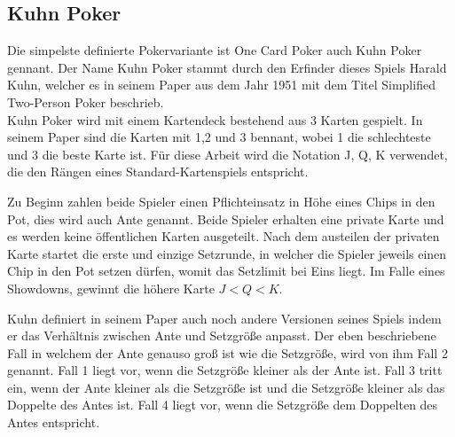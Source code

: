 \subsection{Kuhn Poker}
Die simpelste definierte Pokervariante ist One Card Poker auch Kuhn Poker gennant.
Der Name Kuhn Poker stammt durch den Erfinder dieses Spiels Harald Kuhn, welcher es in seinem Paper aus dem Jahr 1951 mit dem Titel \grqq Simplified Two-Person Poker \glqq beschrieb. \\
Kuhn Poker wird mit einem Kartendeck bestehend aus 3 Karten gespielt.
In seinem Paper sind die Karten mit 1,2 und 3 bennant, wobei 1 die schlechteste und 3 die beste Karte ist.
Für diese Arbeit wird die Notation J, Q, K verwendet, die den Rängen eines Standard-Kartenspiels entspricht.

Zu Beginn zahlen beide Spieler einen Pflichteinsatz in Höhe eines Chips in den Pot, dies wird auch Ante genannt. 
Beide Spieler erhalten eine private Karte und es werden keine öffentlichen Karten ausgeteilt.
Nach dem austeilen der privaten Karte startet die erste und einzige Setzrunde, in welcher die Spieler jeweils einen Chip in den Pot setzen dürfen, womit das Setzlimit bei Eins liegt.
Im Falle eines Showdowns, gewinnt die höhere Karte $J < Q < K$.

Kuhn definiert in seinem Paper auch noch andere Versionen seines Spiels indem er das Verhältnis zwischen Ante und Setzgröße anpasst.
Der eben beschriebene Fall in welchem der Ante genauso groß ist wie die Setzgröße, wird von ihm Fall 2 genannt.
Fall 1 liegt vor, wenn die Setzgröße kleiner als der Ante ist.
Fall 3 tritt ein, wenn der Ante kleiner als die Setzgröße ist und die Setzgröße kleiner als das Doppelte des Antes ist.
Fall 4 liegt vor, wenn die Setzgröße dem Doppelten des Antes entspricht.
\cite{kuhn1951simplified}